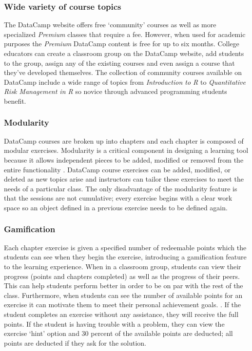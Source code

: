\documentclass[12pt]{article}\usepackage[]{graphicx}\usepackage[]{color}
\begin{document}
\subsubsection{Wide variety of course topics}
The DataCamp website offers free `community' courses as well as more specialized \textit{Premium} classes that require a fee. 
However, when used for academic purposes the \textit{Premium} DataCamp content is free for up to six months.
College educators can create a classroom group on the DataCamp website, add students to the group, 
assign any of the existing courses and even assign a course that they've developed themselves. 
The collection of community courses available on DataCamp include a wide range of topics from \textit{Introduction to R} to
\textit{Quantitative Risk Management in R} so novice through advanced programming students benefit.

\subsubsection{Modularity}
DataCamp courses are broken up into chapters and each chapter is composed of modular exercises. Modularity is a critical component in designing a
learning tool because it allows independent pieces to be added, modified or removed from the entire functionality
\citep{Hare2017}. DataCamp course exercises can be added, modified, or deleted as new topics arise and instructors can tailor
these exercises to meet the needs of a particular class. The only disadvantage of the modularity feature is that the sessions
are not cumulative; every exercise begins with a clear work space so an object defined in a previous exercise needs to be
defined again.

\subsubsection{Gamification}
Each chapter exercise is given a specified number of redeemable points which the students can see when they begin
the exercise, introducing a gamification feature to the learning experience. When in a classroom group, students can view their
progress (points and chapters completed) as well as the progress of their peers. This can help students perform better
in order to be on par with the rest of the class. Furthermore, when students can see the number of available points
for an exercise it can motivate them to meet their personal achievement goals. \citep{Chang2016}. If the student completes an exercise without
any assistance, they will receive the full points. If the student is having trouble with a problem, they can view the exercise `hint' option and 30 percent
of the available points are deducted; all points are deducted if they ask for the solution. 
\end{document}

